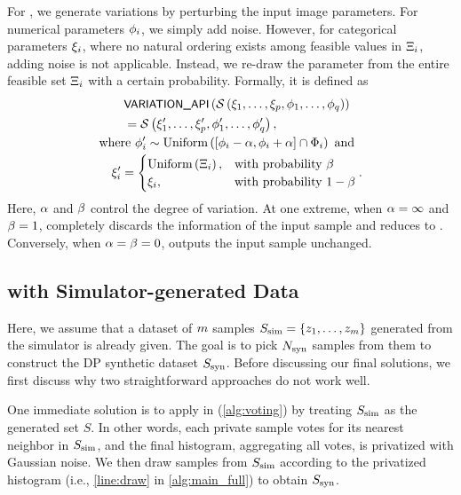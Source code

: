 For \samplevariationapiname{}, we generate variations by perturbing the input image parameters. For numerical parameters $\phi_i$, we simply add noise. However, for categorical parameters $\xi_i$, where no natural ordering exists among feasible values in $\Xi_i$, adding noise is not applicable. Instead, we re-draw the parameter from the entire feasible set $\Xi_i$ with a certain probability. Formally, it is defined as 
\begin{align}
    & \quad\quad\samplevariationapi{\simulatorfun{\cate_1,\ldots,\cate_\numcate,\nume_1,\ldots,\nume_\numnume}} \nonumber\\&\quad\quad=\simulatorfun{\cate_1',\ldots,\cate_\numcate',\nume_1',\ldots,\nume_\numnume'},\label{eq:simulator_variation_api}\\
    &\text{where } \nume_i'\sim \uniform{\brb{\nume_i-\numevariationdegree,\nume_i+\numevariationdegree} \cap \numeset_i}
    \text{ and }\nonumber\\
    &\quad \cate_i'=\begin{cases}
      \uniform{\cateset_i}, & \text{with probability } \catevariationdegree \nonumber\\
      \cate_i, & \text{with probability } 1-\catevariationdegree
    \end{cases}\nonumber.
\end{align}
Here, $\alpha$ and $\beta$ control the degree of variation. At one extreme, when $\alpha=\infty$ and $\beta=1$, \samplevariationapiname{} completely discards the information of the input sample and reduces to \randomsampleapiname{}. Conversely, when $\alpha=\beta=0$, \samplevariationapiname{} outputs the input sample unchanged.


\subsection{\simpe{} with Simulator-generated Data}
\label{sec:method_data}

Here, we assume that a dataset of $m$ samples $S_{\text{sim}}=\left\{ z_1,\ldots,z_m \right\}$ generated from the simulator is already given. The goal is to pick $N_{\mathrm{syn}}$ samples from them to construct the DP synthetic dataset $S_{\mathrm{syn}}$. Before discussing our final solutions, we first discuss why two straightforward approaches do not work well.

 One immediate solution is to apply \dpvotingfunctionname{} in \pe{} (\cref{alg:voting}) by treating $S_{\text{sim}}$ as the generated set $S$. In other words, each private sample votes for its nearest neighbor in $S_{\text{sim}}$, and the final histogram, aggregating all votes, is privatized with Gaussian noise. We then draw samples from $S_{\text{sim}}$ according to the privatized histogram (i.e., \cref{line:draw} in \cref{alg:main_full}) to obtain $S_{\mathrm{syn}}$.

